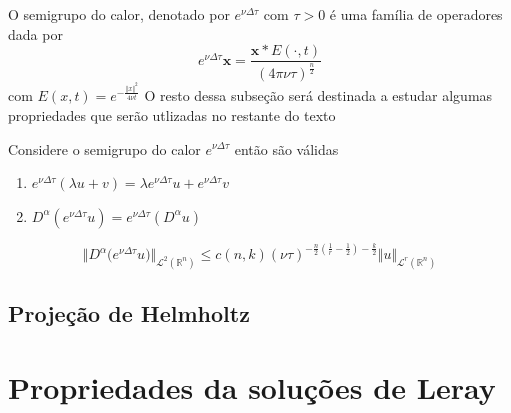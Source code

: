 \documentclass[a4paper, 11pt]{book}
\theoremstyle{definition}
\newcommand{\bR}{\mathbb{R}}
\newcommand{\cL}{\mathcal{L}}
\begin{document}
O semigrupo do calor, denotado por $e^{\nu \Delta \tau}$ com $\tau > 0$ é uma família de operadores dada por
\[
    e^{\nu \Delta \tau} \mathbf{x} = \frac{\mathbf{x} * E(\cdot,t)}{(4\pi \nu \tau)^{\frac{n}{2}}}
\]
com $E(x,t) = e^{-\frac{\Vert x \Vert^2}{4 \nu t}}$
O resto dessa subseção será destinada a estudar algumas propriedades que serão utlizadas no restante do texto

\begin{pbox}
    Considere o semigrupo do calor $e^{\nu\Delta\tau}$ então são válidas
    \begin{enumerate}[leftmargin=*, label=\textbf{(\alph*)}]
        \item $e^{\nu\Delta\tau}(\lambda u + v) = \lambda e^{\nu\Delta\tau} u + e^{\nu\Delta\tau} v$
        \item $D^\alpha (e^{\nu\Delta\tau} u) = e^{\nu\Delta\tau} (D^\alpha u)$
    \end{enumerate}
\end{pbox} 
\begin{prf}

\end{prf}

\begin{pbox}
    \begin{equation} \label{eq:estimativa-util}
        \Vert D^{\alpha} \big( e^{\nu\Delta\tau} u \big) \Vert_{\cL^2(\bR^n)} \leqslant c(n,k) (\nu\tau)^{-\frac{n}{2}\left( \frac{1}{r} - \frac{1}{2} \right) - \frac{k}{2}} \Vert u \Vert_{\cL^r(\bR^n)} 
    \end{equation} 
\end{pbox}
\begin{prf}
    
\end{prf}

\subsection{Projeção de Helmholtz}

\section{Propriedades da soluções de Leray}
\end{document}
